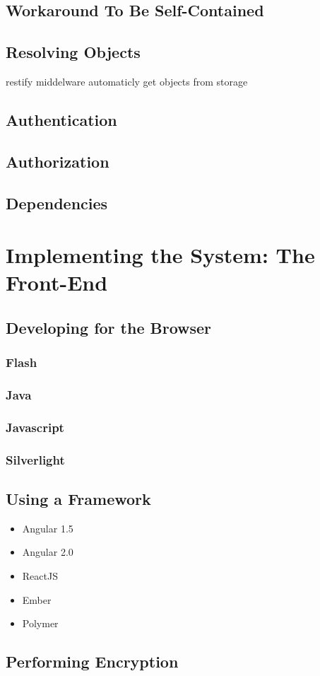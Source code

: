 	\section{Workaround To Be Self-Contained}
	
	\section{Resolving Objects}
		restify middelware automaticly get objects from storage

	\section{Authentication}

	\section{Authorization}



	\section{Dependencies}


\chapter{Implementing the System: The Front-End}
	\section{Developing for the Browser}
		\subsection{Flash}
		\subsection{Java}
		\subsection{Javascript}
		\subsection{Silverlight}


	\section{Using a Framework}
		\begin{itemize}
			\item Angular 1.5
			\item Angular 2.0
			\item ReactJS
			\item Ember
			\item Polymer
		\end{itemize}

	\section{Performing Encryption}